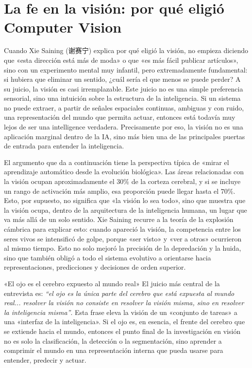 \section{La fe en la visión: por qué eligió Computer Vision}

Cuando Xie Saining (谢赛宁) explica por qué eligió la visión, no empieza diciendo que «esta dirección está más de moda» o que «es más fácil publicar artículos», sino con un experimento mental muy infantil, pero extremadamente fundamental: si hubiera que eliminar un sentido, ¿cuál sería el que menos se puede perder? A su juicio, la visión es casi irremplazable. Este juicio no es una simple preferencia sensorial, sino una intuición sobre la estructura de la inteligencia. Si un sistema no puede extraer, a partir de señales espaciales continuas, ambiguas y con ruido, una representación del mundo que permita actuar, entonces está todavía muy lejos de ser una intelligence verdadera. Precisamente por eso, la visión no es una aplicación marginal dentro de la IA, sino más bien una de las principales puertas de entrada para entender la inteligencia.

El argumento que da a continuación tiene la perspectiva típica de «mirar el aprendizaje automático desde la evolución biológica». Las áreas relacionadas con la visión ocupan aproximadamente el \(30\%\) de la corteza cerebral, y si se incluye un rango de activación más amplio, esa proporción puede llegar hasta el \(70\%\). Esto, por supuesto, no significa que «la visión lo sea todo», sino que muestra que la visión ocupa, dentro de la arquitectura de la inteligencia humana, un lugar que va más allá de un solo sentido. Xie Saining recurre a la teoría de la explosión cámbrica para explicar esto: cuando apareció la visión, la competencia entre los seres vivos se intensificó de golpe, porque «ser visto» y «ver a otros» ocurrieron al mismo tiempo. Esto no solo mejoró la precisión de la depredación y la huida, sino que también obligó a todo el sistema evolutivo a orientarse hacia representaciones, predicciones y decisiones de orden superior.

\begin{importantbox}{«El ojo es el cerebro expuesto al mundo real»}
El juicio más central de la entrevista es: \textit{``el ojo es la única parte del cerebro que está expuesta al mundo real... resolver la visión no consiste en resolver la visión misma, sino en resolver la inteligencia misma''}. Esta frase eleva la visión de un «conjunto de tareas» a una «interfaz de la inteligencia». Si el ojo es, en esencia, el frente del cerebro que se extiende hacia el mundo, entonces el punto final de la investigación en visión no es solo la clasificación, la detección o la segmentación, sino aprender a comprimir el mundo en una representación interna que pueda usarse para entender, predecir y actuar.
\end{importantbox}

